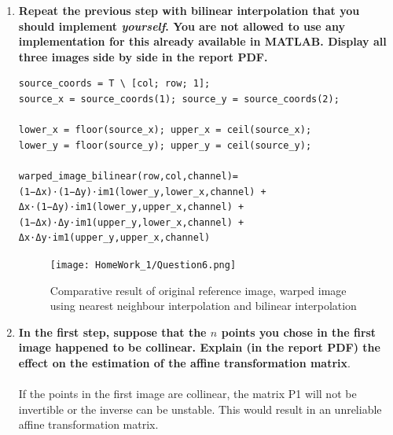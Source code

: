 \documentclass{article}
\begin{document}
\begin{enumerate}
\begin{enumerate}
\newpage
\item \textbf{Repeat the previous step with bilinear interpolation that you should implement \emph{yourself}. You are not allowed to use any implementation for this already available in MATLAB. Display all three images side by side in the report PDF.}


\begin{verbatim}
source_coords = T \ [col; row; 1];
source_x = source_coords(1); source_y = source_coords(2);

lower_x = floor(source_x); upper_x = ceil(source_x);
lower_y = floor(source_y); upper_y = ceil(source_y);

warped_image_bilinear(row,col,channel)=(1−Δx)⋅(1−Δy)⋅im1(lower_y,lower_x,channel) + Δx⋅(1−Δy)⋅im1(lower_y,upper_x,channel) + (1−Δx)⋅Δy⋅im1(upper_y,lower_x,channel) + Δx⋅Δy⋅im1(upper_y,upper_x,channel)
\end{verbatim}

\begin{figure}[h!]
    \centering
    \texttt{[image: HomeWork\_1/Question6.png]}
    \caption{Comparative result of original reference image, warped image using nearest neighbour interpolation and bilinear interpolation}
\end{figure}

\item \textbf{In the first step, suppose that the $n$ points you chose in the first image happened to be collinear. Explain (in the report PDF) the effect on the estimation of the affine transformation matrix}. \\
\\
If the points in the first image are collinear, the matrix P1 will not be invertible or the inverse can be unstable. This would result in an unreliable affine transformation matrix.
\end{enumerate}


\end{enumerate}
\end{document}

